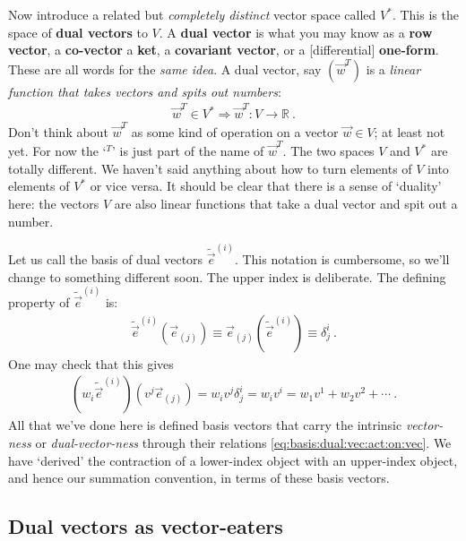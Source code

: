 Now introduce a related but \emph{completely distinct} vector space called $V^*$. This is the space of \textbf{dual vectors} to $V$. A \textbf{dual vector} is what you may know as a \textbf{row vector}, a \textbf{co-vector} a \textbf{ket}, a \textbf{covariant vector}, or a [differential] \textbf{one-form}. These are all words for the \emph{same idea}. A dual vector, say $(\vec{w}^T)$ is a \emph{linear function that takes vectors and spits out numbers}:
\begin{align}
  \vec{w}^T \in V^* \Rightarrow \vec{w}^T: V \to \mathbb{R} \ .
 \end{align}
Don’t think about $\vec{w}^T$ as some kind of operation on a vector $\vec{w}\in V$; at least not yet. For now the `$^T$' is just part of the name of $\vec{w}^T$. The two spaces $V$ and $V^*$ are totally different. We haven’t said anything about how to turn elements of $V$ into elements of $V^*$ or vice versa.
%
It should be clear that there is a sense of `duality’ here: the vectors $V$ are also linear functions that take a dual vector and spit out a number. 

Let us call the basis of dual vectors $\tilde{\vec{e}}^{(i)}$. This notation is cumbersome, so we’ll change to something different soon. The upper index is deliberate. The defining property of $\tilde{\vec{e}}^{(i)}$ is:
\begin{align}
  \tilde{\vec{e}}^{(i)}\left(\vec{e}_{(j)}\right) 
  \equiv 
  \vec{e}_{(j)}\left(\tilde{\vec{e}}^{(i)}\right) 
  \equiv
  \delta^i_j \ .
  \label{eq:basis:dual:vec:act:on:vec}
\end{align}
One may check that this gives
\begin{align}
  \left(w_i\tilde{\vec{e}}^{(i)}\right)\left(v^j\vec{e}_{(j)}\right)
  = w_i v^j \delta^i_j = w_i v^i = w_1 v^1 + w_2 v^2 + \cdots \ .
  \label{eq:oneform:eats:vector:basis}
\end{align}
All that we've done here is defined basis vectors that carry the intrinsic \emph{vector-ness} or \emph{dual-vector-ness} through their relations \eqref{eq:basis:dual:vec:act:on:vec}. We have `derived' the contraction of a lower-index object with an upper-index object, and hence our summation convention, in terms of these basis vectors.

\subsection{Dual vectors as vector-eaters}

